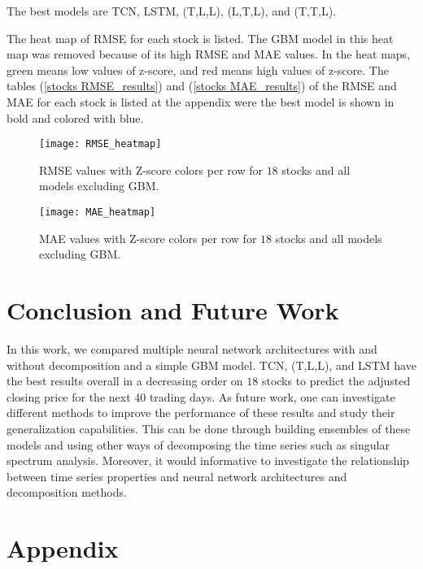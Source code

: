 \documentclass[12pt, A4]{article}
\begin{document}
The best models are TCN, LSTM, (T,L,L), (L,T,L), and (T,T,L).

The heat map of RMSE for each stock is listed. The GBM model in this heat map was removed because of its high RMSE and MAE values. In the heat maps, green means low values of z-score, and red means high values of z-score. The tables (\ref{stocks RMSE_results}) and (\ref{stocks MAE_results}) of the RMSE and MAE for each stock is listed at the appendix were the best model is shown in bold and colored with blue.

\begin{figure}[H]
	\centering
	\texttt{[image: RMSE\_heatmap]}
	\caption{RMSE values with Z-score colors per row for $18$ stocks and all models excluding GBM.}
	\label{RMSE_heatmap}
\end{figure}

\begin{figure}[H]
	\centering
	\texttt{[image: MAE\_heatmap]}
	\caption{MAE values with Z-score colors per row for $18$ stocks and all models excluding GBM.}
	\label{MAE_heatmap}
\end{figure}

\section{Conclusion and Future Work}
In this work, we compared multiple neural network architectures with and without decomposition and a simple GBM model. TCN, (T,L,L), and LSTM have the best results overall in a decreasing order on $18$ stocks to predict the adjusted closing price for the next $40$ trading days. As future work, one can investigate different methods to improve the performance of these results and study their generalization capabilities. This can be done through building ensembles of these models and using other ways of decomposing the time series such as singular spectrum analysis.  Moreover, it would informative to investigate the relationship between time series properties and neural network architectures and decomposition methods.




\clearpage

\section{Appendix}
\end{document}
